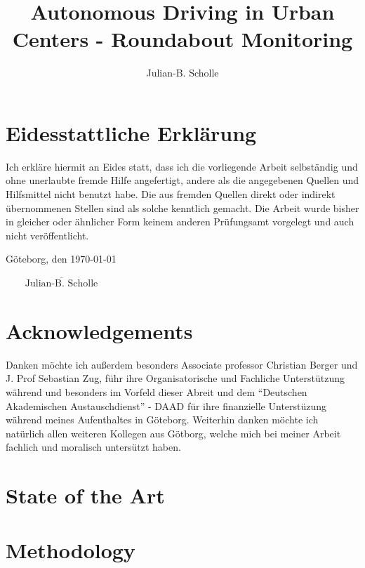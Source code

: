 \documentclass[11pt,oneside,openright]{mpreport}
\title{Autonomous Driving in Urban Centers - Roundabout Monitoring}
\author{Julian-B. Scholle}
\begin{document}
\maketitle



\chapter*{Eidesstattliche Erklärung}
Ich erkläre hiermit an Eides statt, dass ich die vorliegende Arbeit selbständig und
ohne unerlaubte fremde Hilfe angefertigt, andere als die angegebenen Quellen und
Hilfsmittel nicht benutzt habe. Die aus fremden Quellen direkt oder indirekt
übernommenen Stellen sind als solche kenntlich gemacht.
Die Arbeit wurde bisher in gleicher oder ähnlicher Form keinem anderen
Prüfungsamt vorgelegt und auch nicht veröffentlicht.

\noindent Göteborg, den \today
\begin{flushright}
$\overline{~~~~~~~~~\mbox{Julian-B. Scholle}~~~~~~~~~}$
\end{flushright}


\chapter*{Acknowledgements}
Danken möchte ich außerdem besonders Associate professor Christian Berger und J. Prof Sebastian Zug, führ ihre Organisatorische und Fachliche Unterstützung während und besonders im Vorfeld dieser Abreit und
dem ``Deutschen Akademischen Austauschdienst'' - DAAD für ihre finanzielle Unterstüzung während meines Aufenthaltes in Göteborg.
Weiterhin danken möchte ich natürlich allen weiteren Kollegen aus Götborg, welche mich bei meiner Arbeit fachlich und moralisch untersützt haben.



\tableofcontents
\clearpage 





\chapter{State of the Art}

\chapter{Methodology}
\end{document}
